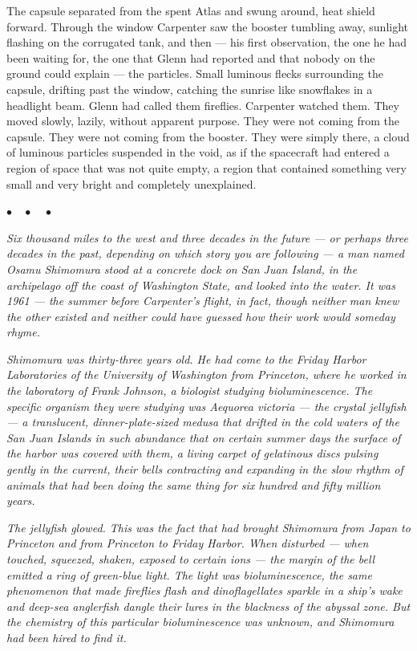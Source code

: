 \documentclass[12pt, letterpaper]{article}
\begin{document}
The capsule separated from the spent Atlas and swung around, heat shield forward. Through the window Carpenter saw the booster tumbling away, sunlight flashing on the corrugated tank, and then --- his first observation, the one he had been waiting for, the one that Glenn had reported and that nobody on the ground could explain --- the particles. Small luminous flecks surrounding the capsule, drifting past the window, catching the sunrise like snowflakes in a headlight beam. Glenn had called them fireflies. Carpenter watched them. They moved slowly, lazily, without apparent purpose. They were not coming from the capsule. They were not coming from the booster. They were simply there, a cloud of luminous particles suspended in the void, as if the spacecraft had entered a region of space that was not quite empty, a region that contained something very small and very bright and completely unexplained.

\begin{center}
$\bullet\quad\bullet\quad\bullet$
\end{center}

\emph{Six thousand miles to the west and three decades in the future --- or perhaps three decades in the past, depending on which story you are following --- a man named Osamu Shimomura stood at a concrete dock on San Juan Island, in the archipelago off the coast of Washington State, and looked into the water. It was 1961 --- the summer before Carpenter's flight, in fact, though neither man knew the other existed and neither could have guessed how their work would someday rhyme.}

\emph{Shimomura was thirty-three years old. He had come to the Friday Harbor Laboratories of the University of Washington from Princeton, where he worked in the laboratory of Frank Johnson, a biologist studying bioluminescence. The specific organism they were studying was Aequorea victoria --- the crystal jellyfish --- a translucent, dinner-plate-sized medusa that drifted in the cold waters of the San Juan Islands in such abundance that on certain summer days the surface of the harbor was covered with them, a living carpet of gelatinous discs pulsing gently in the current, their bells contracting and expanding in the slow rhythm of animals that had been doing the same thing for six hundred and fifty million years.}

\emph{The jellyfish glowed. This was the fact that had brought Shimomura from Japan to Princeton and from Princeton to Friday Harbor. When disturbed --- when touched, squeezed, shaken, exposed to certain ions --- the margin of the bell emitted a ring of green-blue light. The light was bioluminescence, the same phenomenon that made fireflies flash and dinoflagellates sparkle in a ship's wake and deep-sea anglerfish dangle their lures in the blackness of the abyssal zone. But the chemistry of this particular bioluminescence was unknown, and Shimomura had been hired to find it.}
\end{document}

